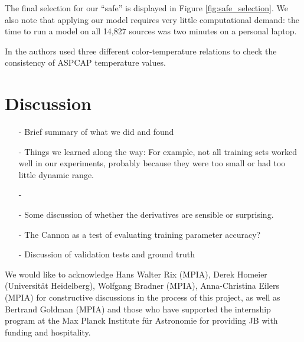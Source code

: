 \documentclass[preprint]{aastex62}
\begin{document}
The final selection for our ``safe'' is displayed in Figure \ref{fig:safe_selection}. We also note that applying our model requires very little computational demand: the time to run a model on all 14,827 sources was two minutes on a personal laptop.

In \citealt{Schmidt:2016} the authors used three different color-temperature relations to check the consistency of ASPCAP temperature values.

\section{Discussion} \label{sec:discussion}

\begin{enumerate}
\item[-] Brief summary of what we did and found{}

\item[-] Things we learned along the way: For example, not all training sets worked well in our experiments, probably because they were too small or had too little dynamic range.

\item[-] \color{gcolor}{HOGG: Some discussion of precision and accuracy: The Cannon can produce precise results, but is only as accurate as its training set.}\color{black}

\item[-] Some discussion of whether the derivatives are sensible or surprising. 

\item[-] The Cannon as a test of evaluating training parameter accuracy? \color{gcolor}{HOGG: Should this be precision, not accuracy? For example adding a constant factor (say adding +1000 to every metallicity training value) does not change the scatter of the test labels}\color{black}

\item[-] Discussion of validation tests and ground truth
\end{enumerate}

\acknowledgements
We would like to acknowledge Hans Walter Rix (MPIA), Derek Homeier (Universit{\"a}t Heidelberg), Wolfgang Bradner (MPIA), Anna-Christina Eilers (MPIA) for constructive discussions in the process of this project, as well as Bertrand Goldman (MPIA) and those who have supported the internship program at the Max Planck Institute f{\"u}r Astronomie for providing JB with funding and hospitality. \color{gcolor}{HOGG: SDSS acknowledgments... Grants and stuff...}\color{black}  
\end{document}
